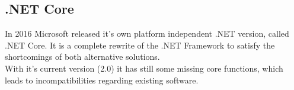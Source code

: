 \subsection{.NET Core}
In 2016 Microsoft released it's own platform independent .NET version, called .NET Core. It is a complete rewrite of the .NET Framework to satisfy the shortcomings of both alternative solutions.\\
With it's current version (2.0) it has still some missing core functions, which leads to incompatibilities regarding existing software.
